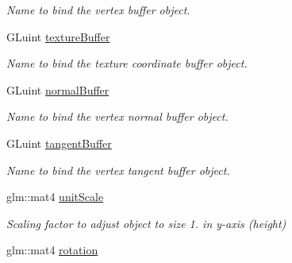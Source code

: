 \begin{DoxyCompactItemize}
\begin{DoxyCompactList}\small\item\em Name to bind the vertex buffer object. \end{DoxyCompactList}\item 
G\+Luint \hyperlink{class_obj_g_p_u_data_aa35cf8a237a4b9a84156c880b534214a}{texture\+Buffer}\hypertarget{class_obj_g_p_u_data_aa35cf8a237a4b9a84156c880b534214a}{}\label{class_obj_g_p_u_data_aa35cf8a237a4b9a84156c880b534214a}

\begin{DoxyCompactList}\small\item\em Name to bind the texture coordinate buffer object. \end{DoxyCompactList}\item 
G\+Luint \hyperlink{class_obj_g_p_u_data_a3d56bdaa9f44c1c780761b0cd10f7dc3}{normal\+Buffer}\hypertarget{class_obj_g_p_u_data_a3d56bdaa9f44c1c780761b0cd10f7dc3}{}\label{class_obj_g_p_u_data_a3d56bdaa9f44c1c780761b0cd10f7dc3}

\begin{DoxyCompactList}\small\item\em Name to bind the vertex normal buffer object. \end{DoxyCompactList}\item 
G\+Luint \hyperlink{class_obj_g_p_u_data_a8b67db12ad372e7b48e436808617788c}{tangent\+Buffer}\hypertarget{class_obj_g_p_u_data_a8b67db12ad372e7b48e436808617788c}{}\label{class_obj_g_p_u_data_a8b67db12ad372e7b48e436808617788c}

\begin{DoxyCompactList}\small\item\em Name to bind the vertex tangent buffer object. \end{DoxyCompactList}\item 
glm\+::mat4 \hyperlink{class_obj_g_p_u_data_ac28a5f3da3cea8eaf4b4cc52596297fd}{unit\+Scale}\hypertarget{class_obj_g_p_u_data_ac28a5f3da3cea8eaf4b4cc52596297fd}{}\label{class_obj_g_p_u_data_ac28a5f3da3cea8eaf4b4cc52596297fd}

\begin{DoxyCompactList}\small\item\em Scaling factor to adjust object to size 1. in y-\/axis (height) \end{DoxyCompactList}\item 
glm\+::mat4 \hyperlink{class_obj_g_p_u_data_a208435c6c7c618dcf608e165297de85a}{rotation}\hypertarget{class_obj_g_p_u_data_a208435c6c7c618dcf608e165297de85a}{}\label{class_obj_g_p_u_data_a208435c6c7c618dcf608e165297de85a}


\end{DoxyCompactItemize}
